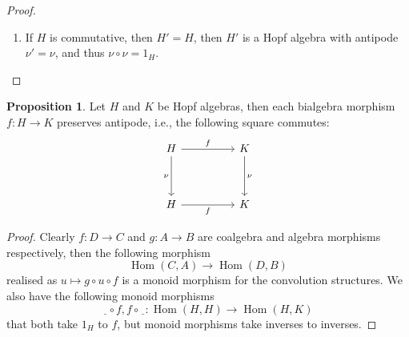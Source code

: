 \documentclass[8pt]{article}
\theoremstyle{definition}
\theoremstyle{definition}
\theoremstyle{definition}
\theoremstyle{definition}
\theoremstyle{definition}
\theoremstyle{definition}
\theoremstyle{definition}
\newtheorem{prop}{Proposition}[section]
\theoremstyle{definition}
\theoremstyle{definition}
\theoremstyle{definition}
\theoremstyle{definition}
\theoremstyle{definition}
\theoremstyle{definition}
\theoremstyle{definition}
\theoremstyle{question}
\begin{document}
\begin{proof}
\begin{enumerate}
\[\begin{tikzcd}
      && R \ar[urrr, "\eta"']
    \end{tikzcd}
    \]
    iff the following commutes
    \[
    \begin{tikzcd}
      H \ar[r, "\delta"] \ar[drr, "\varepsilon"'] & H \otimes H \ar[r, "\sigma"] & H \otimes H \ar[r, "1 \otimes \nu'"] & H \otimes H \ar[r, "\mu"] & H \ar[r, "\nu"] & H \\
      && R \ar[urr, "\eta"']
    \end{tikzcd}
    \]
    \item If $H$ is commutative, then $H' = H$, then $H'$ is a Hopf algebra with antipode $\nu' = \nu$, and thus
    $\nu \circ \nu = 1_H$. 
  \end{enumerate}
\end{proof}

\begin{prop}
  Let $H$ and $K$ be Hopf algebras, then each bialgebra morphism $f : H \to K$ preserves antipode,
  i.e., the following square commutes:
  \[
  \begin{tikzcd}
    H \ar[rr, "f"] \ar[dd, "\nu"'] && K \ar[dd, "\nu"] \\
    \\
    H \ar[rr, "f"'] && K
  \end{tikzcd}
  \]
\end{prop}
\begin{proof}
  Clearly $f : D \to C$ and $g : A \to B$ are coalgebra and algebra morphisms respectively, then
  the following morphism
  \[
  \operatorname{Hom}(C, A) \to \operatorname{Hom}(D, B)
  \]
  realised as $u \mapsto g \circ u \circ f$ is a monoid morphism for the convolution structures.
  We also have the following monoid morphisms
  \[
  \underline{\:\:} \circ f, f \circ \underline{\:\:} : \operatorname{Hom}(H, H) \to \operatorname{Hom}(H, K)
  \]
  that both take $1_H$ to $f$, but monoid morphisms take inverses to inverses.
\end{proof}
\end{document}
